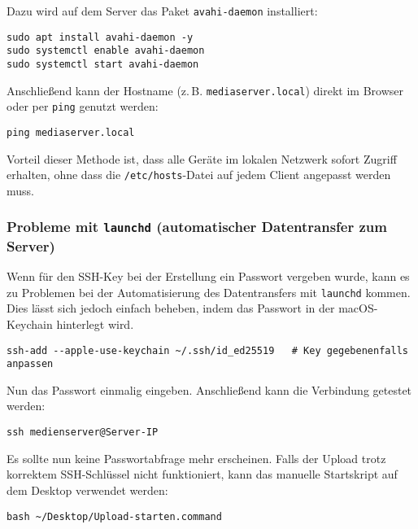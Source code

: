\documentclass[12pt,a4paper]{report}
\begin{document}
\begin{enumerate}
      Dazu wird auf dem Server das Paket \texttt{avahi-daemon} installiert:

      \begin{verbatim}
sudo apt install avahi-daemon -y
sudo systemctl enable avahi-daemon
sudo systemctl start avahi-daemon
      \end{verbatim}

      Anschließend kann der Hostname (z.\,B. \texttt{mediaserver.local}) direkt im Browser oder per \texttt{ping} genutzt werden:

      \begin{verbatim}
ping mediaserver.local
      \end{verbatim}

      Vorteil dieser Methode ist, dass alle Geräte im lokalen Netzwerk sofort Zugriff erhalten, ohne dass die \texttt{/etc/hosts}-Datei auf jedem Client angepasst werden muss.
    \end{enumerate}


    \subsubsection*{Probleme mit \texttt{launchd} (automatischer Datentransfer zum Server)}
    Wenn für den SSH-Key bei der Erstellung ein Passwort vergeben wurde, kann es zu Problemen bei der Automatisierung des Datentransfers mit \texttt{launchd} kommen.  
    Dies lässt sich jedoch einfach beheben, indem das Passwort in der macOS-Keychain hinterlegt wird.

    \begin{verbatim}
ssh-add --apple-use-keychain ~/.ssh/id_ed25519   # Key gegebenenfalls anpassen
    \end{verbatim}

    Nun das Passwort einmalig eingeben. Anschließend kann die Verbindung getestet werden:

    \begin{verbatim}
ssh medienserver@Server-IP
    \end{verbatim}

    Es sollte nun keine Passwortabfrage mehr erscheinen.  
    Falls der Upload trotz korrektem SSH-Schlüssel nicht funktioniert, kann das manuelle Startskript auf dem Desktop verwendet werden:

    \begin{verbatim}
bash ~/Desktop/Upload-starten.command
    \end{verbatim}
\end{document}
